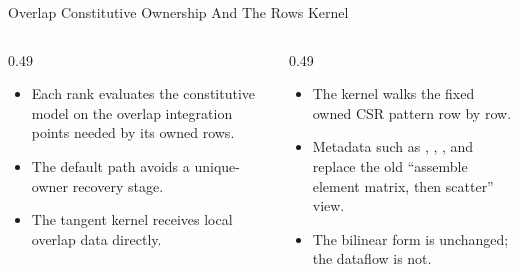 \documentclass[aspectratio=169,10pt]{beamer}
\begin{document}
\begin{frame}{Overlap Constitutive Ownership And The Rows Kernel}
\small
\begin{columns}[T,totalwidth=\textwidth]
\begin{column}{0.49\textwidth}
\begin{softbox}
\begin{itemize}
  \item Each rank evaluates the constitutive model on the overlap integration points needed by its owned rows.
  \item The default path avoids a unique-owner recovery stage.
  \item The tangent kernel receives local overlap data directly.
\end{itemize}
\end{softbox}
\end{column}
\begin{column}{0.49\textwidth}
\begin{softbox}
\begin{itemize}
  \item The kernel walks the fixed owned CSR pattern row by row.
  \item Metadata such as , , , and  replace the old ``assemble element matrix, then scatter'' view.
  \item The bilinear form is unchanged; the dataflow is not.
\end{itemize}
\end{softbox}
\end{column}
\end{columns}
\end{frame}
\end{document}
